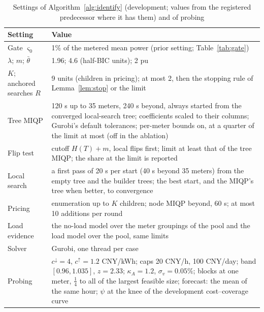 \documentclass[journal,onecolumn,11pt]{IEEEtran}
\begin{document}
\begin{table}[h]
\caption{Settings of Algorithm~\ref{alg:identify} (development; values from the registered predecessor where it has them)
and of probing}\label{tab:settings}
\centering
\begin{tabular}{@{}p{}p{}@{}}
\toprule
Setting & Value\\
\midrule
Gate $\varsigma_0$ & 1\% of the metered mean power (prior setting; Table~\ref{tab:gate})\\
$\lambda$; $m$; $\bar\theta$ & 1.96; 4.6 (half-BIC units); 2 pu\\
$K$; anchored searches $R$ & 9 units (children in pricing); at most 2, then the stopping rule of Lemma~\ref{lem:stop} or the limit\\
Tree MIQP & 120 s up to 35 meters, 240 s beyond, always started from the converged local-search tree; coefficients
scaled to their columns; Gurobi's default tolerances; per-meter bounds on, at a quarter of the limit at most (off in the ablation)\\
Flip test & cutoff $H(T)+m$, local flips first; limit at least that of the tree MIQP; the share at the limit is reported\\
Local search & a first pass of 20 s per start (40 s beyond 35 meters) from the empty tree and the builder trees; the
best start, and the MIQP's tree when better, to convergence\\
Pricing & enumeration up to $K$ children; node MIQP beyond, 60 s; at most 10 additions per round\\
Load evidence & the no-load model over the meter groupings of the pool and the load model over the pool, same limits\\
Solver & Gurobi, one thread per case\\
\midrule
Probing & $c^\downarrow=4$, $c^\uparrow=1.2$ CNY/kWh; caps 20 CNY/h, 100 CNY/day; band $[0.96,1.035]$, $z=2.33$;
$\kappa_A=1.2$, $\sigma_v=0.05\%$; blocks at one meter, $\frac14$ to all of the largest feasible size; forecast: the mean of the
same hour; $\psi$ at the knee of the development cost--coverage curve\\
\bottomrule
\end{tabular}
\end{table}
\end{document}
